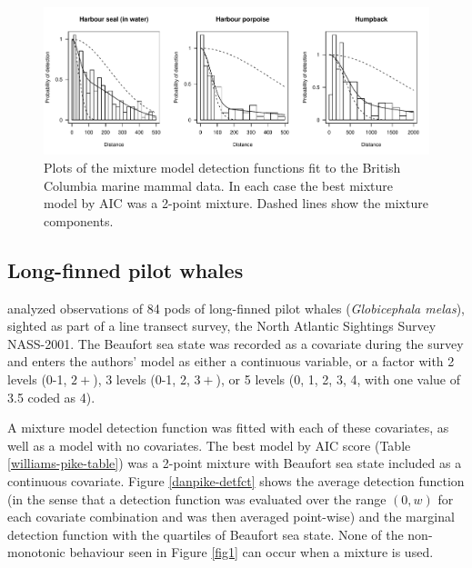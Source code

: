 \documentclass[authoryear,preprint,review,12pt]{elsarticle}
\begin{document}
\begin{figure}
\centering
\includegraphics[width=\textwidth]{analyses/williamsplots.pdf}
\caption{Plots of the mixture model detection functions fit to the British Columbia marine mammal data. In each case the best mixture model by AIC was a 2-point mixture. Dashed lines show the mixture components.}
\label{williams-detfcts}
\end{figure}

\subsection{Long-finned pilot whales}

\cite{Pike:2003ug} analyzed observations of 84 pods of long-finned pilot whales (\textit{Globicephala melas}), sighted as part of a line transect survey, the North Atlantic Sightings Survey NASS-2001. The Beaufort sea state was recorded as a covariate during the survey and enters the authors' model as either a continuous variable, or a factor with 2 levels (0-1, $2+$), 3 levels (0-1, 2, $3+$), or 5 levels (0, 1, 2, 3, 4, with one value of 3.5 coded as 4).

A mixture model detection function was fitted with each of these covariates, as well as a model with no covariates.  The best model by AIC score (Table \ref{williams-pike-table}) was a 2-point mixture with Beaufort sea state included as a continuous covariate. Figure \ref{danpike-detfct} shows the average detection function (in the sense that a detection function was evaluated over the range $(0,w)$ for each covariate combination and was then averaged point-wise) and the marginal detection function with the quartiles of Beaufort sea state. None of the non-monotonic behaviour seen in Figure \ref{fig1} can occur when a mixture is used.
\end{document}
